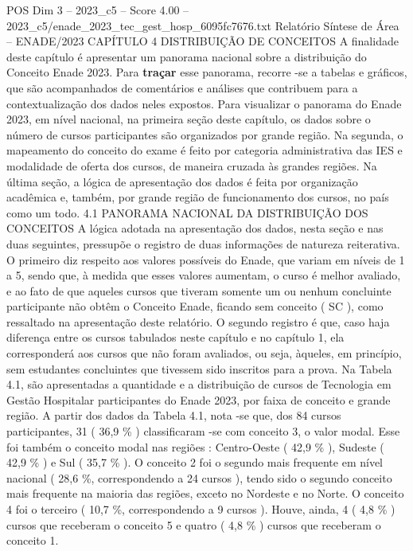 \begin{textsample}{POS Dim 3 – 2023\_c5 – Score 4.00 – 2023\_c5/enade\_2023\_tec\_gest\_hosp\_6095fc7676.txt}  \label{ex:f3_pos_051}
Relatório Síntese de Área – ENADE/2023 CAPÍTULO 4 DISTRIBUIÇÃO DE CONCEITOS A finalidade deste capítulo é apresentar um panorama nacional sobre a distribuição do Conceito Enade 2023.
Para \textbf{traçar} esse panorama, recorre -se a tabelas e gráficos, que são acompanhados de comentários e análises que contribuem para a contextualização dos dados neles expostos.
Para visualizar o panorama do Enade 2023, em nível nacional, na primeira seção deste capítulo, os dados sobre o número de cursos participantes são organizados por grande região.
Na segunda, o mapeamento do conceito do exame é feito por categoria administrativa das IES e modalidade de oferta dos cursos, de maneira cruzada às grandes regiões.
Na última seção, a lógica de apresentação dos dados é feita por organização acadêmica e, também, por grande região de funcionamento dos cursos, no país como um todo. 4.1 PANORAMA NACIONAL DA DISTRIBUIÇÃO DOS CONCEITOS A lógica adotada na apresentação dos dados, nesta seção e nas duas seguintes, pressupõe o registro de duas informações de natureza reiterativa.
O primeiro diz respeito aos valores possíveis do Enade, que variam em níveis de 1 a 5, sendo que, à medida que esses valores aumentam, o curso é melhor avaliado, e ao fato de que aqueles cursos que tiveram somente um ou nenhum concluinte participante não obtêm o Conceito Enade, ficando sem conceito ( SC ), como ressaltado na apresentação deste relatório.
O segundo registro é que, caso haja diferença entre os cursos tabulados neste capítulo e no capítulo 1, ela corresponderá aos cursos que não foram avaliados, ou seja, àqueles, em princípio, sem estudantes concluintes que tivessem sido inscritos para a prova.
Na Tabela 4.1, são apresentadas a quantidade e a distribuição de cursos de Tecnologia em Gestão Hospitalar participantes do Enade 2023, por faixa de conceito e grande região.
A partir dos dados da Tabela 4.1, nota -se que, dos 84 cursos participantes, 31 ( 36,9 \% ) classificaram -se com conceito 3, o valor modal.
Esse foi também o conceito modal nas regiões : Centro-Oeste ( 42,9 \% ), Sudeste ( 42,9 \% ) e Sul ( 35,7 \% ).
O conceito 2 foi o segundo mais frequente em nível nacional ( 28,6 \%, correspondendo a 24 cursos ), tendo sido o segundo conceito mais frequente na maioria das regiões, exceto no Nordeste e no Norte.
O conceito 4 foi o terceiro ( 10,7 \%, correspondendo a 9 cursos ).
Houve, ainda, 4 ( 4,8 \% ) cursos que receberam o conceito 5 e quatro ( 4,8 \% ) cursos que receberam o conceito 1.

\end{textsample}
